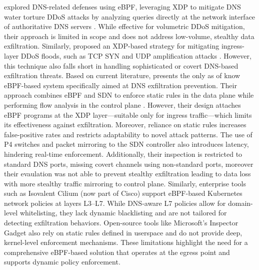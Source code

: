 \documentclass [11pt, proquest] {uwthesis}[2020/02/24]
\begin{document}
\citeauthor{9165454} explored DNS-related defenses using eBPF, leveraging XDP to mitigate DNS water torture DDoS attacks by analyzing queries directly at the network interface of authoritative DNS servers \cite{9165454}. While effective for volumetric DDoS mitigation, their approach is limited in scope and does not address low-volume, stealthy data exfiltration. Similarly, \citeauthor{bertin2017xdp} proposed an XDP-based strategy for mitigating ingress-layer DDoS floods, such as TCP SYN and UDP amplification attacks \cite{bertin2017xdp}. However, this technique also falls short in handling sophisticated or covert DNS-based exfiltration threats.
Based on current literature, \citeauthor{steadman2021dnsxp} presents the only as of know eBPF-based system specifically aimed at DNS exfiltration prevention. Their approach combines eBPF and SDN to enforce static rules in the data plane while performing flow analysis in the control plane \cite{steadman2021dnsxp, 8725640}. However, their design attaches eBPF programs at the XDP layer—suitable only for ingress traffic—which limits its effectiveness against exfiltration. Moreover, reliance on static rules increases false-positive rates and restricts adaptability to novel attack patterns. The use of P4 switches and packet mirroring to the SDN controller also introduces latency, hindering real-time enforcement. Additionally, their inspection is restricted to standard DNS ports, missing covert channels using non-standard ports, moreover their evaulation was not able to prevent stealthy exfiltration leading to data loss with more stealthy traffic mirroring to control plane. Similarly, enterprise tools such as Isovalent Cilium (now part of Cisco) support eBPF-based Kubernetes network policies at layers L3–L7. While DNS-aware L7 policies allow for domain-level whitelisting, they lack dynamic blacklisting and are not tailored for detecting exfiltration behaviors. Open-source tools like Microsoft’s Inspector Gadget also rely on static rules defined in userspace and do not provide deep, kernel-level enforcement mechanisms. These limitations highlight the need for a comprehensive eBPF-based solution that operates at the egress point and supports dynamic policy enforcement. 
\end{document}

